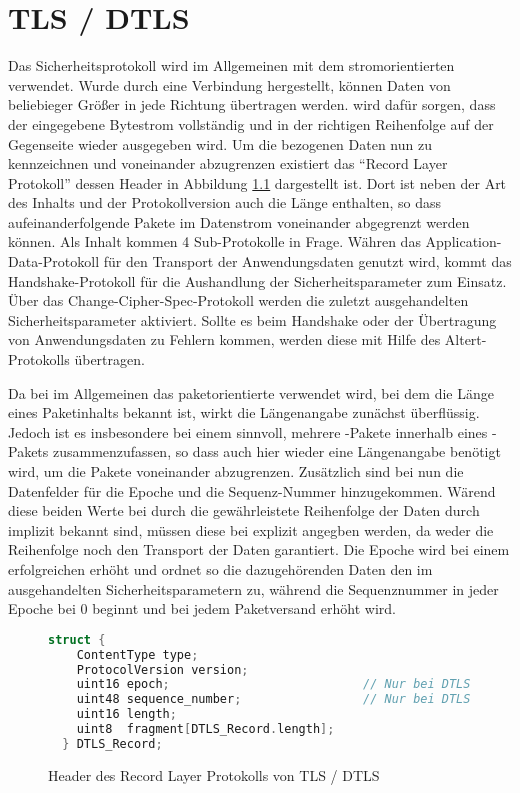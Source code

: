 \chapter{TLS / DTLS}
\label{chp:dtls}

Das Sicherheitsprotokoll  \cite{rfc5246} wird im Allgemeinen mit dem stromorientierten  verwendet.
Wurde durch  eine Verbindung hergestellt, können Daten von beliebieger Größer in jede Richtung
übertragen werden.  wird dafür sorgen, dass der eingegebene Bytestrom vollständig und in der
richtigen Reihenfolge auf der Gegenseite wieder ausgegeben wird. Um die  bezogenen Daten nun
zu kennzeichnen und voneinander abzugrenzen existiert das "`Record Layer Protokoll"' dessen Header in Abbildung \ref{fig:recordlayer}
dargestellt ist. Dort ist neben der Art des Inhalts und der Protokollversion auch die Länge enthalten, so dass
aufeinanderfolgende Pakete im Datenstrom voneinander abgegrenzt werden können. Als Inhalt kommen 4 Sub-Protokolle
in Frage. Währen das Application-Data-Protokoll für den Transport der Anwendungsdaten genutzt wird, kommt
das Handshake-Protokoll für die Aushandlung der Sicherheitsparameter zum Einsatz. Über das Change-Cipher-Spec-Protokoll
werden die zuletzt ausgehandelten Sicherheitsparameter aktiviert. Sollte es beim Handshake oder der Übertragung
von Anwendungsdaten zu Fehlern kommen, werden diese mit Hilfe des Altert-Protokolls übertragen.

Da bei  \cite{rfc6347} im Allgemeinen das paketorientierte  verwendet wird, bei dem die Länge eines
Paketinhalts bekannt ist, wirkt die Längenangabe zunächst überflüssig. Jedoch ist es insbesondere bei einem
 sinnvoll, mehrere -Pakete innerhalb eines -Pakets zusammenzufassen,
so dass auch hier wieder eine Längenangabe benötigt wird, um die Pakete voneinander abzugrenzen.
Zusätzlich sind bei  nun die Datenfelder für die Epoche und die Sequenz-Nummer hinzugekommen.
Wärend diese beiden Werte bei  durch die gewährleistete Reihenfolge der Daten durch 
implizit bekannt sind, müssen diese bei  explizit angegben werden, da  weder die
Reihenfolge noch den Transport der Daten garantiert. Die Epoche wird bei einem erfolgreichen 
erhöht und ordnet so die dazugehörenden Daten den im  ausgehandelten Sicherheitsparametern zu,
während die Sequenznummer in jeder Epoche bei 0 beginnt und bei jedem Paketversand erhöht wird.

\begin{figure}[ht]
  \centering
  \begin{lstlisting}[language=c]
  struct {
    ContentType type;
    ProtocolVersion version;
    uint16 epoch;                           // Nur bei DTLS
    uint48 sequence_number;                 // Nur bei DTLS
    uint16 length;
    uint8  fragment[DTLS_Record.length];
  } DTLS_Record;
  \end{lstlisting}
  \caption{Header des Record Layer Protokolls von TLS / DTLS}
  \label{fig:recordlayer}
\end{figure}

